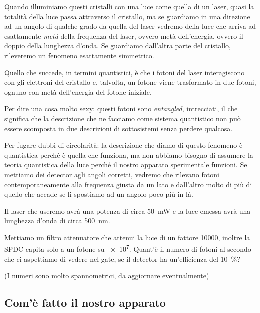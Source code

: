 \documentclass{article}
\begin{document}
Quando illuminiamo questi cristalli con una luce come quella di un laser, quasi la totalità della luce passa attraverso il cristallo, ma se guardiamo in una direzione ad un angolo di qualche grado da quella del laser vedremo della luce che arriva ad esattamente \emph{metà} della frequenza del laser, ovvero metà dell'energia, ovvero il doppio della lunghezza d'onda. 
Se guardiamo dall'altra parte del cristallo, rileveremo un fenomeno esattamente simmetrico.

Quello che succede, in termini quantistici, è che i fotoni del laser interagiscono con gli elettroni del cristallo e, talvolta, un fotone viene trasformato in due fotoni, ognuno con metà dell'energia del fotone iniziale.

Per dire una cosa molto sexy: questi fotoni sono \emph{entangled}, intrecciati, il che significa che la descrizione che ne facciamo come sistema quantistico non può essere scomposta in due descrizioni di sottosistemi senza perdere qualcosa. 

Per fugare dubbi di circolarità: la descrizione che diamo di questo fenomeno è quantistica perché è quella che funziona, ma non abbiamo bisogno di assumere la teoria quantistica della luce perché il nostro apparato sperimentale funzioni.
Se mettiamo dei detector agli angoli corretti, vedremo che rilevano fotoni contemporaneamente alla frequenza giusta da un lato e dall'altro molto di più di quello che accade se li spostiamo ad un angolo poco più in là. 

\begin{exo}
Il laser che useremo avrà una potenza di circa \SI{50}{mW} e la luce emessa avrà una lunghezza d'onda di circa \SI{500}{nm}. 

Mettiamo un filtro attenuatore che attenui la luce di un fattore 10000, inoltre la SPDC capita solo a un fotone su \num{e7}. Quant'è il numero di fotoni al secondo che ci aspettiamo di vedere nel gate, se il detector ha un'efficienza del \SI{10}{\percent}?

(I numeri sono molto spannometrici, da aggiornare eventualmente)
\end{exo}


\subsection{Com'è fatto il nostro apparato}

\end{document}
